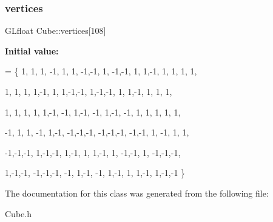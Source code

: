 \subsubsection{\texorpdfstring{vertices}{vertices}}
{\footnotesize\ttfamily G\+Lfloat Cube\+::vertices\mbox{[}108\mbox{]}}

{\bfseries Initial value\+:}
\begin{DoxyCode}
= \{ 1, 1, 1,  -1, 1, 1,  -1,-1, 1,      
                       -1,-1, 1,   1,-1, 1,   1, 1, 1,      

                        1, 1, 1,   1,-1, 1,   1,-1,-1,      
                        1,-1,-1,   1, 1,-1,   1, 1, 1,      

                        1, 1, 1,   1, 1,-1,  -1, 1,-1,      
                       -1, 1,-1,  -1, 1, 1,   1, 1, 1,      

                       -1, 1, 1,  -1, 1,-1,  -1,-1,-1,      
                       -1,-1,-1,  -1,-1, 1,  -1, 1, 1,      

                       -1,-1,-1,   1,-1,-1,   1,-1, 1,      
                        1,-1, 1,  -1,-1, 1,  -1,-1,-1,      

                        1,-1,-1,  -1,-1,-1,  -1, 1,-1,      
                       -1, 1,-1,   1, 1,-1,   1,-1,-1 \}
\end{DoxyCode}


The documentation for this class was generated from the following file\+:\begin{DoxyCompactItemize}
\item 
Cube.\+h\end{DoxyCompactItemize}

